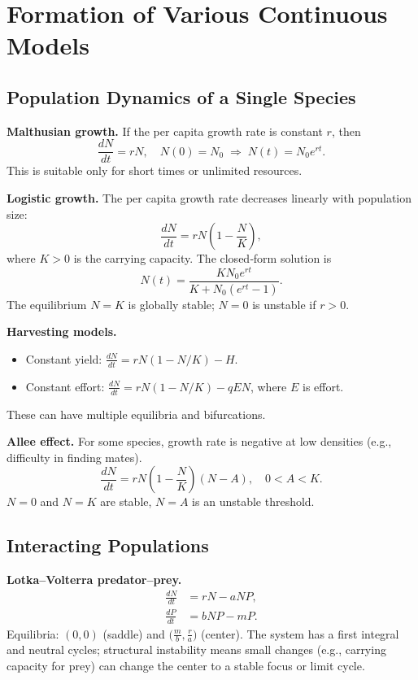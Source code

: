 \documentclass[12pt,a4paper]{book}
\begin{document}
\section{Formation of Various Continuous Models}
\subsection{Population Dynamics of a Single Species}
\textbf{Malthusian growth.} If the per capita growth rate is constant $r$, then
\[
\frac{dN}{dt} = r N, \quad N(0)=N_0 \;\Longrightarrow\; N(t) = N_0 e^{rt}.
\]
This is suitable only for short times or unlimited resources.

\textbf{Logistic growth.} The per capita growth rate decreases linearly with population size:
\[
\frac{dN}{dt} = r N \left(1 - \frac{N}{K}\right),
\]
where $K>0$ is the carrying capacity. The closed‑form solution is
\[
N(t) = \frac{K N_0 e^{rt}}{K + N_0 (e^{rt} - 1)}.
\]
The equilibrium $N=K$ is globally stable; $N=0$ is unstable if $r>0$.

\textbf{Harvesting models.}
\begin{itemize}
    \item Constant yield: $\displaystyle \frac{dN}{dt} = r N(1 - N/K) - H$.
    \item Constant effort: $\displaystyle \frac{dN}{dt} = r N(1 - N/K) - q E N$, where $E$ is effort.
\end{itemize}
These can have multiple equilibria and bifurcations.

\textbf{Allee effect.} For some species, growth rate is negative at low densities (e.g., difficulty in finding mates).
\[
\frac{dN}{dt} = r N \left(1 - \frac{N}{K}\right)(N - A), \quad 0 < A < K.
\]
$N=0$ and $N=K$ are stable, $N=A$ is an unstable threshold.

\subsection{Interacting Populations}
\textbf{Lotka–Volterra predator–prey.}
\begin{align*}
\frac{dN}{dt} &= r N - a N P,\\
\frac{dP}{dt} &= b N P - m P.
\end{align*}
Equilibria: $(0,0)$ (saddle) and $\bigl(\frac{m}{b}, \frac{r}{a}\bigr)$ (center). The system has a first integral and neutral cycles; structural instability means small changes (e.g., carrying capacity for prey) can change the center to a stable focus or limit cycle.
\end{document}
